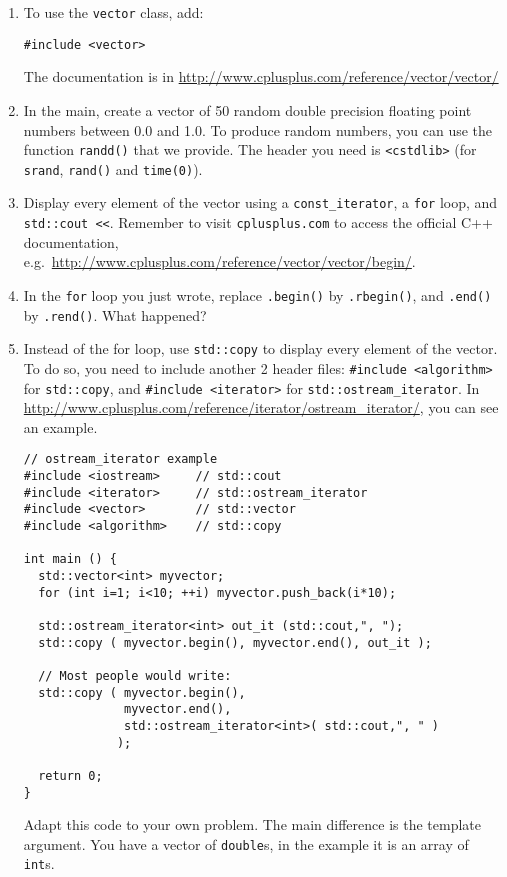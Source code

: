 \begin{enumerate}

\item To use the \verb+vector+ class, add:
\begin{lstlisting}
#include <vector>
\end{lstlisting}
The documentation is in \url{http://www.cplusplus.com/reference/vector/vector/}

\item In the main, create a vector of 50 random double precision floating point numbers between 0.0 and 1.0. To produce random numbers, you can use the function \verb+randd()+ that we provide. The header you need is \verb+<cstdlib>+ (for \verb+srand+, \verb+rand()+ and \verb+time(0)+). 

\item Display every element of the vector using a \verb+const_iterator+, a \verb+for+ loop, and \verb+std::cout <<+. 
Remember to visit \verb+cplusplus.com+ to access the official C++ documentation, e.g.~\url{http://www.cplusplus.com/reference/vector/vector/begin/}.

\item In the \verb+for+ loop you just wrote, replace \verb+.begin()+ by \verb+.rbegin()+, and \verb+.end()+ by \verb+.rend()+. What happened?

\item Instead of the for loop, use \verb+std::copy+ to display every element of the vector. To do so, you need to include another 2 header files:
\verb+#include <algorithm>+ for \verb+std::copy+, and \verb+#include <iterator>+ for \verb+std::ostream_iterator+. 
In \url{http://www.cplusplus.com/reference/iterator/ostream_iterator/}, you can see an example. 
\begin{lstlisting}
// ostream_iterator example
#include <iostream>     // std::cout
#include <iterator>     // std::ostream_iterator
#include <vector>       // std::vector
#include <algorithm>    // std::copy

int main () {
  std::vector<int> myvector;
  for (int i=1; i<10; ++i) myvector.push_back(i*10);

  std::ostream_iterator<int> out_it (std::cout,", ");
  std::copy ( myvector.begin(), myvector.end(), out_it );
  
  // Most people would write:
  std::copy ( myvector.begin(), 
              myvector.end(), 
              std::ostream_iterator<int>( std::cout,", " )
             );
 
  return 0;
}
\end{lstlisting}
Adapt this code to your own problem. The main difference is the template argument. 
You have a vector of \verb+double+s, in the example it is an array of \verb+int+s.


\end{enumerate}
